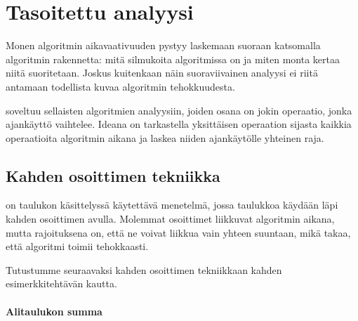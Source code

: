 \chapter{Tasoitettu analyysi}


Monen algoritmin aikavaativuuden pystyy laskemaan
suoraan katsomalla algoritmin rakennetta:
mitä silmukoita algoritmissa on ja miten monta
kertaa niitä suoritetaan.
Joskus kuitenkaan näin suoraviivainen analyysi ei
riitä antamaan todellista kuvaa algoritmin tehokkuudesta.

 soveltuu sellaisten
algoritmien analyysiin, joiden osana on jokin operaatio,
jonka ajankäyttö vaihtelee.
Ideana on tarkastella yksittäisen operaation
sijasta kaikkia operaatioita algoritmin
aikana ja laskea niiden ajankäytölle yhteinen raja.

\section{Kahden osoittimen tekniikka}


 on taulukon käsittelyssä
käytettävä menetelmä, jossa taulukkoa käydään läpi
kahden osoittimen avulla.
Molemmat osoittimet liikkuvat algoritmin aikana,
mutta rajoituksena on, että ne voivat liikkua vain
yhteen suuntaan, mikä takaa, että algoritmi toimii tehokkaasti.

Tutustumme seuraavaksi kahden osoittimen tekniikkaan
kahden esimerkkitehtävän kautta.

\subsubsection{Alitaulukon summa}


